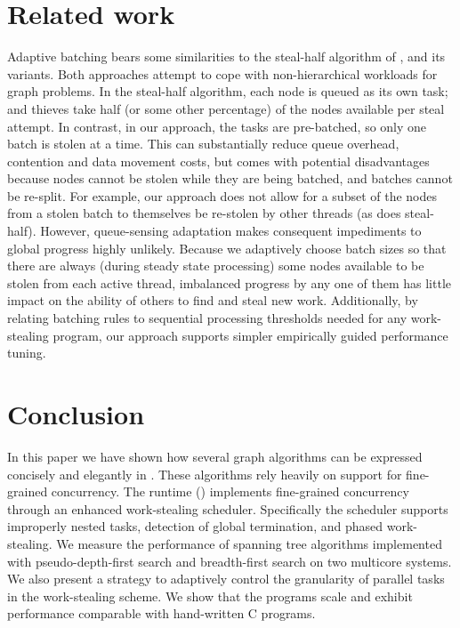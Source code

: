 \section{Related work}\label{sec:related}
Adaptive batching bears some similarities to the steal-half algorithm
of \cite{shavit-steal-half}, and its variants. Both approaches attempt to cope
with non-hierarchical workloads for graph problems. In the steal-half
algorithm, each node is queued as its own task; and thieves take half
(or some other percentage) of the nodes available per steal
attempt. In contrast, in our approach, the tasks are pre-batched, so
only one batch is stolen at a time. This can substantially reduce
queue overhead, contention and data movement costs, but comes with
potential disadvantages because nodes cannot be stolen while they are
being batched, and batches cannot be re-split.  For example, our
approach does not allow for a subset of the nodes from a stolen batch
to themselves be re-stolen by other threads (as does
steal-half). However, queue-sensing adaptation makes consequent
impediments to global progress highly unlikely.  Because we adaptively
choose batch sizes so that there are always (during steady state
processing) some nodes available to be stolen from each active thread,
imbalanced progress by any one of them has little impact on the
ability of others to find and steal new work.  Additionally, by
relating batching rules to sequential processing thresholds needed for
any work-stealing program, our approach supports simpler empirically
guided performance tuning.
\section{Conclusion}\label{sec:concl}
In this paper we have shown how several graph algorithms can be
expressed concisely and elegantly in \Xten. These algorithms rely
heavily on support for fine-grained concurrency. The \Xten{} runtime
(\XWS) implements fine-grained concurrency through an enhanced
work-stealing scheduler. Specifically the scheduler supports
improperly nested tasks, detection of global termination, and phased
work-stealing.  We measure the performance of spanning tree algorithms
implemented with pseudo-depth-first search and breadth-first search on
two multicore systems. We also present a strategy to adaptively control the granularity of parallel tasks in the work-stealing scheme. We show that the \XWS{} programs scale and
exhibit performance comparable with hand-written C programs.

